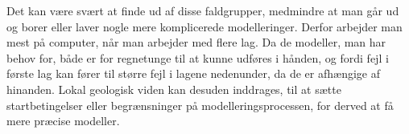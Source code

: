 Det kan være svært at finde ud af disse faldgrupper, medmindre at man går ud og borer eller laver nogle mere komplicerede modelleringer. Derfor arbejder man mest på computer, når man arbejder med flere lag. Da de modeller, man har behov for, både er for regnetunge til at kunne udføres i hånden, og fordi fejl i første lag kan fører til større fejl i lagene nedenunder, da de er afhængige af hinanden. Lokal geologisk viden kan desuden inddrages, til at sætte startbetingelser eller begrænsninger på modelleringsprocessen, for derved at få mere præcise modeller.
